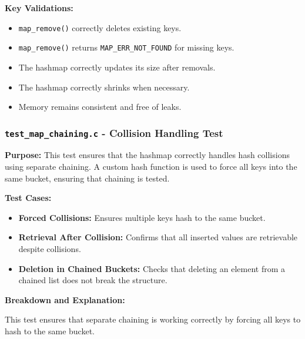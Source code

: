 \documentclass[titlepage]{article}
\begin{document}
\textbf{Key Validations:}
\begin{itemize}
    \item \texttt{map\_remove()} correctly deletes existing keys.
    \item \texttt{map\_remove()} returns \texttt{MAP\_ERR\_NOT\_FOUND} for missing keys.
    \item The hashmap correctly updates its size after removals.
    \item The hashmap correctly shrinks when necessary.
    \item Memory remains consistent and free of leaks.
\end{itemize}


\subsubsection{\texttt{test\_map\_chaining.c} - Collision Handling Test}

\textbf{Purpose:}
This test ensures that the hashmap correctly handles hash collisions using separate chaining.
A custom hash function is used to force all keys into the same bucket, ensuring that chaining is tested.

\textbf{Test Cases:}
\begin{itemize}
    \item \textbf{Forced Collisions:} Ensures multiple keys hash to the same bucket.
    \item \textbf{Retrieval After Collision:} Confirms that all inserted values are retrievable despite collisions.
    \item \textbf{Deletion in Chained Buckets:} Checks that deleting an element from a chained list does not break the structure.
\end{itemize}

\textbf{Breakdown and Explanation:}

This test ensures that separate chaining is working correctly by forcing all keys to hash to the same bucket.
\end{document}
